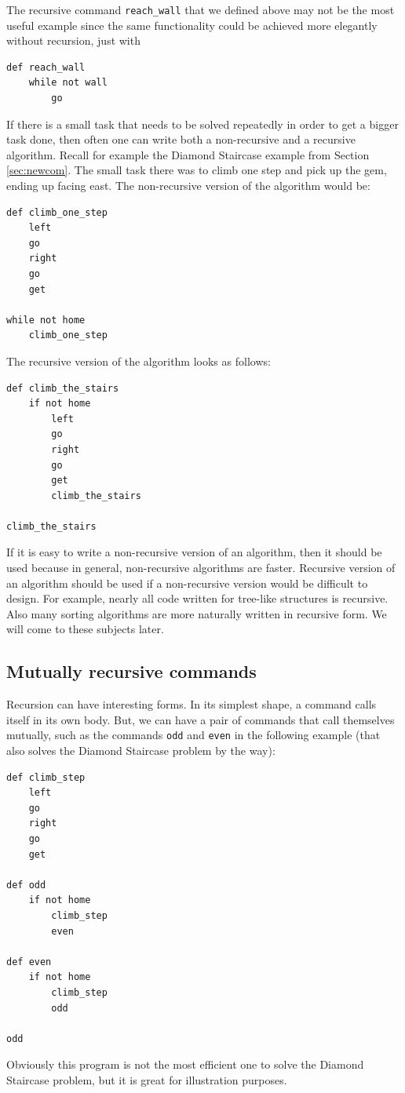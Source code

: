 The recursive command {\tt reach\_wall} that we defined above may not be the most useful example 
since the same functionality could be achieved more elegantly without recursion, just with

\begin{verbatim}
def reach_wall
    while not wall
        go
\end{verbatim}
If there is a small task that needs to be solved repeatedly in order to get a bigger task done,
then often one can write both a non-recursive and a recursive algorithm. Recall for example the Diamond
Staircase example from Section \ref{sec:newcom}. The small task there was to climb one step and pick 
up the gem, ending up facing east. The non-recursive version of the algorithm would be:

\begin{verbatim}
def climb_one_step
    left
    go
    right
    go
    get

while not home
    climb_one_step
\end{verbatim}
The recursive version of the algorithm looks as follows:

\begin{verbatim}
def climb_the_stairs
    if not home
        left
        go
        right
        go
        get
        climb_the_stairs

climb_the_stairs
\end{verbatim}
If it is easy to write a non-recursive version of an algorithm, then it should be used
because in general, non-recursive algorithms are faster. 
Recursive version of an algorithm should be used if a non-recursive version would 
be difficult to design. For example, nearly all code written for tree-like structures 
is recursive. Also many sorting algorithms are more naturally written in recursive form.
We will come to these subjects later.

\subsection{Mutually recursive commands}

Recursion can have interesting forms. In its simplest shape, a command 
calls itself in its own body. But, we can have a pair of commands
that call themselves mutually, such as the commands {\tt odd} and 
{\tt even} in the following example (that also solves the Diamond Staircase
problem by the way):
 
\begin{verbatim}
def climb_step
    left
    go
    right
    go
    get 

def odd
    if not home
        climb_step
        even
    
def even
    if not home
        climb_step
        odd
    
odd
\end{verbatim}
Obviously this program is not the most efficient one to solve the 
Diamond Staircase problem, but it is great for illustration purposes.


